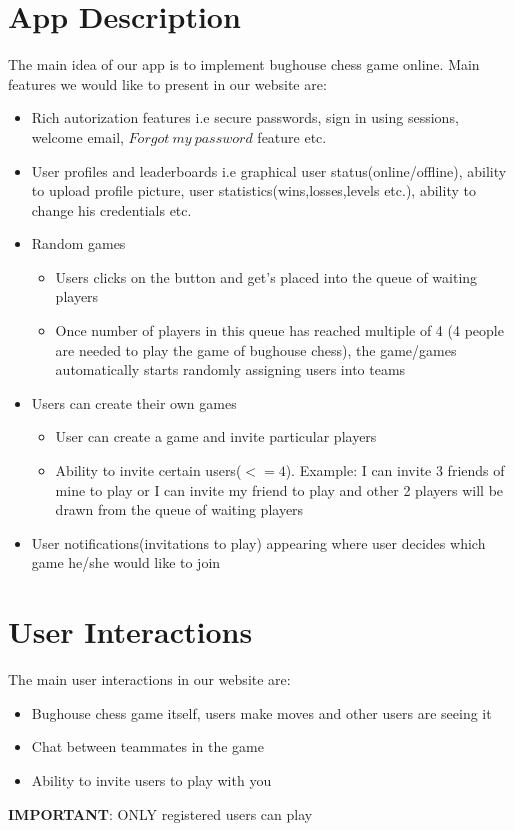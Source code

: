 \documentclass[12pt]{article}
\begin{document}
\section*{App Description}
The main idea of our app is to implement bughouse chess game online. Main features we would like to present in our website are:
\begin{itemize}
\item Rich autorization features i.e secure passwords, sign in using sessions, welcome email, $Forgot\ my\ password$ feature etc.
\item User profiles and leaderboards i.e graphical user status(online/offline), ability to upload profile picture, user statistics(wins,losses,levels etc.), ability to change his credentials etc.
\item  Random games
	\begin{itemize}
	\item Users clicks on the button and get's placed into the queue of waiting players
	\item Once number of players in this queue has reached multiple of 4 (4 people are needed to play the game of bughouse chess), the game/games automatically starts randomly assigning users into teams 
	\end{itemize}
\item Users can create their own games
	\begin{itemize}
	\item User can create a game and invite particular players
	\item Ability to invite certain users($<=4$). Example: I can invite 3 friends of mine to play or I can invite my friend to play and other 2 players will be drawn from the queue of waiting players
	\end{itemize}
\item User notifications(invitations to play) appearing where user decides which game he/she would like to join
\end{itemize}
\section*{User Interactions}
The main user interactions in our website are:
\begin{itemize}
\item Bughouse chess game itself, users make moves and other users are seeing it
\item Chat between teammates in the game
\item Ability to invite users to play with you
\end{itemize}
{\bf IMPORTANT}: ONLY registered users can play
\end{document}

